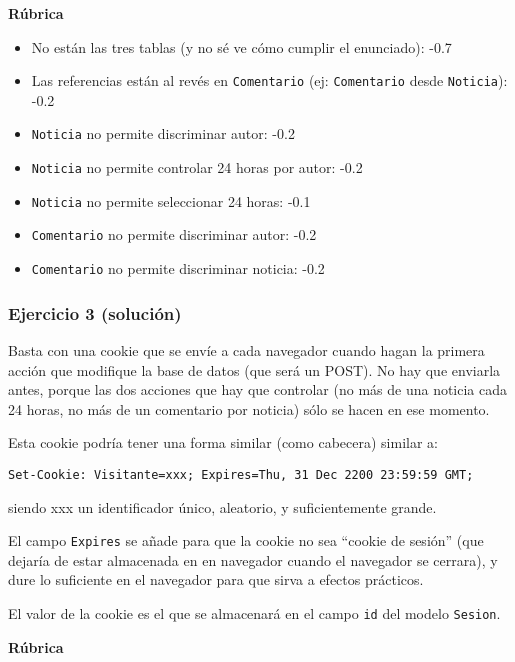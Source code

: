 \vspace{.4cm}\textbf{Rúbrica}

\begin{itemize}
\item No están las tres tablas (y no sé ve cómo cumplir el enunciado): -0.7
\item Las referencias están al revés en \texttt{Comentario} (ej: \texttt{Comentario} desde \texttt{Noticia}): -0.2
\item \texttt{Noticia} no permite discriminar autor: -0.2
\item \texttt{Noticia} no permite controlar 24 horas por autor: -0.2
\item \texttt{Noticia} no permite seleccionar 24 horas: -0.1
\item \texttt{Comentario} no permite discriminar autor: -0.2
\item \texttt{Comentario} no permite discriminar noticia: -0.2
\end{itemize}

\subsubsection{Ejercicio 3 (solución)}

Basta con una cookie que se envíe a cada navegador cuando hagan la primera acción que modifique la base de datos (que será un POST). No hay que enviarla antes, porque las dos acciones que hay que controlar (no más de una noticia cada 24 horas, no más de un comentario por noticia) sólo se hacen en ese momento.

Esta cookie podría tener una forma similar (como cabecera) similar a:

\begin{verbatim}
Set-Cookie: Visitante=xxx; Expires=Thu, 31 Dec 2200 23:59:59 GMT;
\end{verbatim}

siendo xxx un identificador único, aleatorio, y suficientemente grande.

El campo \texttt{Expires} se añade para que la cookie no sea ``cookie de sesión'' (que dejaría de estar almacenada en en navegador cuando el navegador se cerrara), y dure lo suficiente en el navegador para que sirva a efectos prácticos.

El valor de la cookie es el que se almacenará en el campo \texttt{id} del modelo  \texttt{Sesion}.

\vspace{.4cm}\textbf{Rúbrica}


